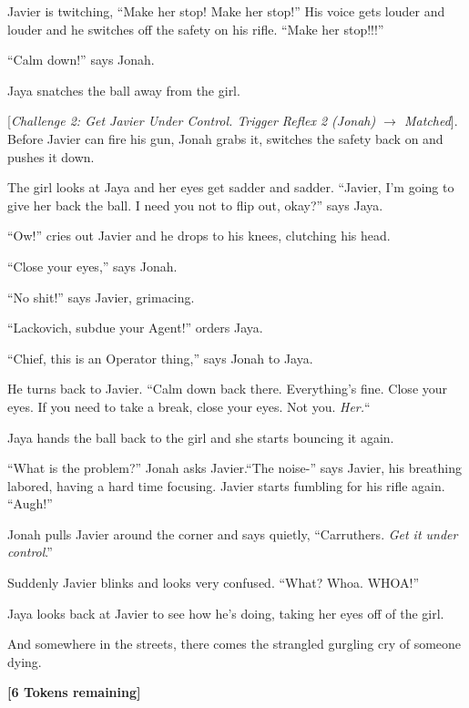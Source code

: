 {Javier is twitching, ``Make her stop!  Make her stop!'' His voice gets louder and louder and he switches off the safety on his rifle.  ``Make her stop!!!''

``Calm down!'' says Jonah.

Jaya snatches the ball away from the girl.

{[}\textit{Challenge 2: Get Javier Under Control.  Trigger Reflex 2 (Jonah) $\rightarrow$ Matched}{]}. Before Javier can fire his gun, Jonah grabs it, switches the safety back on and pushes it down. 

The girl looks at Jaya and her eyes get sadder and sadder.  ``Javier, I'm going to give her back the ball.  I need you not to flip out, okay?'' says Jaya.

``Ow!'' cries out Javier and he drops to his knees, clutching his head.

``Close your eyes,'' says Jonah.

``No shit!'' says Javier, grimacing.

``Lackovich, subdue your Agent!'' orders Jaya.

``Chief, this is an Operator thing,'' says Jonah to Jaya.

He turns back to Javier.  ``Calm down back there.  Everything's fine.  Close your eyes.  If you need to take a break, close your eyes.  Not you.  \textit{Her.}``  

Jaya hands the ball back to the girl and she starts bouncing it again.

``What is the problem?'' Jonah asks Javier.``The noise-'' says Javier, his breathing labored, having a hard time focusing.  Javier starts fumbling for his rifle again. ``Augh!''

Jonah pulls Javier around the corner and says quietly, ``Carruthers.  \textit{Get it under control}.''

Suddenly Javier blinks and looks very confused.  ``What?  Whoa.  WHOA!''

Jaya looks back at Javier to see how he's doing, taking her eyes off of the girl.



And somewhere in the streets, there comes the strangled gurgling cry of someone dying.





\textbf{{[}6 Tokens remaining{]}}







}
